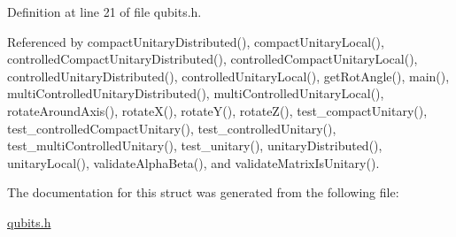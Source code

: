 Definition at line 21 of file qubits.h.

Referenced by compactUnitaryDistributed(), compactUnitaryLocal(), controlledCompactUnitaryDistributed(), controlledCompactUnitaryLocal(), controlledUnitaryDistributed(), controlledUnitaryLocal(), getRotAngle(), main(), multiControlledUnitaryDistributed(), multiControlledUnitaryLocal(), rotateAroundAxis(), rotateX(), rotateY(), rotateZ(), test\_\-compactUnitary(), test\_\-controlledCompactUnitary(), test\_\-controlledUnitary(), test\_\-multiControlledUnitary(), test\_\-unitary(), unitaryDistributed(), unitaryLocal(), validateAlphaBeta(), and validateMatrixIsUnitary().

The documentation for this struct was generated from the following file:\begin{DoxyCompactItemize}
\item 
\hyperlink{qubits_8h}{qubits.h}\end{DoxyCompactItemize}
